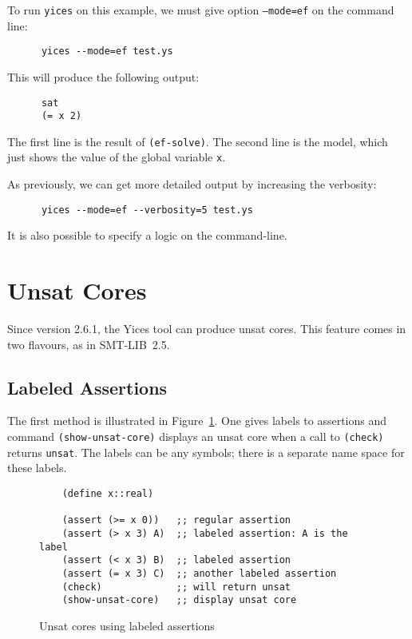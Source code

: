 \documentclass[11pt,twoside,fleqn,openright,titlepage]{cslreport}
\begin{document}
\medskip\noindent
To run \texttt{yices} on this example, we must give option
\texttt{--mode=ef} on the command line:
\begin{small}
\begin{verbatim}
      yices --mode=ef test.ys
\end{verbatim}
\end{small}
This will produce the following output:
\begin{small}
\begin{verbatim}
      sat
      (= x 2)
\end{verbatim}
\end{small}
The first line is the result of \texttt{(ef-solve)}. The second line
is the model, which just shows the value of the global variable
\texttt{x}.

\medskip\noindent
As previously, we can get more detailed output by increasing the verbosity:
\begin{small}
\begin{verbatim}
      yices --mode=ef --verbosity=5 test.ys
\end{verbatim}
\end{small}
It is also possible to specify a logic on the command-line.

\section{Unsat Cores}

Since version 2.6.1, the Yices tool can produce unsat cores. This
feature comes in two flavours, as in SMT-LIB~2.5.

\subsection{Labeled Assertions}

The first method is illustrated in
Figure~\ref{example:labeled-assertions}. One gives labels to assertions and
command \texttt{(show-unsat-core)} displays an unsat core when a call
to \texttt{(check)} returns \texttt{unsat}.  The labels can be any
symbols; there is a separate name space for these labels.

\begin{figure}[h]
\begin{footnotesize}
\begin{verbatim}
    (define x::real)

    (assert (>= x 0))   ;; regular assertion
    (assert (> x 3) A)  ;; labeled assertion: A is the label
    (assert (< x 3) B)  ;; labeled assertion
    (assert (= x 3) C)  ;; another labeled assertion
    (check)             ;; will return unsat
    (show-unsat-core)   ;; display unsat core
\end{verbatim}
\end{footnotesize}
\caption{Unsat cores using labeled assertions}
\label{example:labeled-assertions}
\end{figure}
\end{document}
